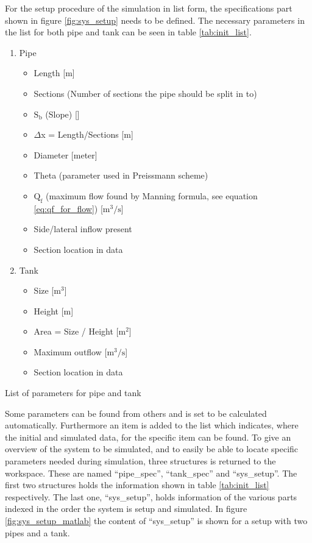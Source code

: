 For the setup procedure of the simulation in list form, the specifications part shown in figure \ref{fig:sys_setup} needs to be defined. The necessary parameters in the list for both pipe and tank can be seen in table \ref{tab:init_list}. 
\begin{table}[H]
\begin{enumerate} 
	\item Pipe
	\begin{itemize}
		\item Length [m]
		\item Sections (Number of sections the pipe should be split in to)
		\item $\text{S}_\text{b}$ (Slope) [\textperthousand]
		\item $\Delta$x = Length/Sections [m]
		\item Diameter [meter]
		\item Theta (parameter used in Preissmann scheme)
		\item $\text{Q}_{\text{f}}$ (maximum flow found by Manning formula, see equation \ref{eq:qf_for_flow}) [$\text{m}^\text{3}/\text{s}$]
		\item Side/lateral inflow present 
		\item Section location in data 
	\end{itemize}
	\item Tank
	\begin{itemize}
		\item Size [$\text{m}^\text{3}$]
		\item Height [m]
		\item Area = Size / Height [$\text{m}^\text{2}$]
		\item Maximum outflow [$\text{m}^\text{3}/\text{s}$]
		\item Section location in data 
	\end{itemize}
	
\end{enumerate}
\caption{List of parameters for pipe and tank}
\label{tab:init_list}
\end{table}
Some parameters can be found from others and is set to be calculated automatically. 
Furthermore an item is added to the list which indicates, where the initial and simulated data, for the specific item can be found.
To give an overview of the system to be simulated, and to easily be able to locate specific parameters needed during simulation, three structures is returned to the workspace. These are named ``pipe\_spec'', ``tank\_spec'' and ``sys\_setup''. The first two structures holds the information shown in table \ref{tab:init_list} respectively. The last one, ``sys\_setup'', holds information of the various parts indexed in the order the system is setup and simulated. In figure \ref{fig:sys_setup_matlab} the content of ``sys\_setup'' is shown for a setup with two pipes and a tank.

